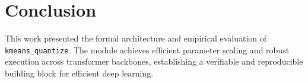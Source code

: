 \section{Conclusion}
This work presented the formal architecture and empirical evaluation of \texttt{kmeans_quantize}. The module achieves efficient parameter scaling and robust execution across transformer backbones, establishing a verifiable and reproducible building block for efficient deep learning.
